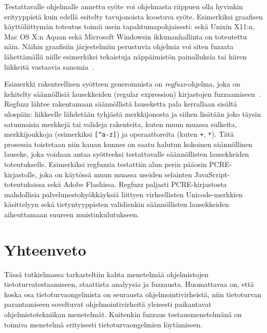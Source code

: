 Testattavalle ohjelmalle annettu syöte voi ohjelmasta riippuen olla
hyvinkin erityyppistä kuin edellä esitelty tavujonoista koostuva syöte.
Esimerkiksi graafisen käyttöliittymän toteutus toimii usein tapahtumapohjaisesti:
sekä Unixin X11:n, Mac OS X:n Aquan sekä Microsoft Windowsin ikkunanhallinta on toteutettu näin.
Näihin graafisiin järjestelmiin perustuvia ohjelmia voi siten fuzzata lähettämällä
niille esimerkiksi tekaistuja näppäimistön painalluksia tai hiiren liikkeitä vastaavia
sanomia~\cite{X11Fuzz,MacOsFuzz,WinNtFuzz}.

Esimerkki rakenteellisen syötteen generoinnista on \emph{regfuzz}-ohjelma,
joka on kehitelty säännöllisiä lausekkeiden (regular expression) kirjastojen
fuzzaamiseen~\cite{RegFuzz}.
Regfuzz lähtee rakentamaan säännöllistä lauseketta pala kerrallaan sisältä ulospäin:
liikkeelle lähdetään tyhjästä merkkijonosta ja siihen lisätään joko täysin
satunnaisia merkkejä tai valideja rakenteita,
kuten muun muassa sulkeita, merkkijoukkoja (esimerkiksi \texttt{[\^{}a-z]}) ja
operaattoreita (kuten \texttt{+}, \texttt{*}).
Tätä prosessia toistetaan niin kauan kunnes on saatu halutun kokoinen säännöllinen lauseke,
joka voidaan antaa syötteeksi testattavalle säännöllisten lausekkeiden toteutukselle.
Esimerkiksi regfuzzia testattiin alun perin pääosin PCRE-kirjastolle,
joka on käytössä muun muassa useiden selainten JavaScript-toteutuksissa sekä Adobe Flashissa.
Regfuzz paljasti PCRE-kirjastosta mahdollisia palvelunestohyökkäyksiä liittyen
virheellisten Unicode-merkkien käsittelyyn sekä tietyntyyppisten validienkin
säännöllisten lausekkeiden aiheuttamaan suureen muistinkulutukseen.

\section{Yhteenveto}
Tässä tutkielmassa tarkasteltiin kahta menetelmää ohjelmistojen tietoturvatestaamiseen,
staattista analyysia ja fuzzausta.
Huomattavaa on, että koska osa tietoturvaongelmista on seurausta ohjelmointivirheistä,
niin tietoturvan parantamiseen soveltuvat ohjelmointivirheitä yleisesti paikantavat ohjelmistotekniikan menetelmät.
Kuitenkin fuzzaus testausmenetelmänä on toimiva menetelmä erityisesti tietoturvaongelmien löytämiseen.
\fixme[kirjoita]
